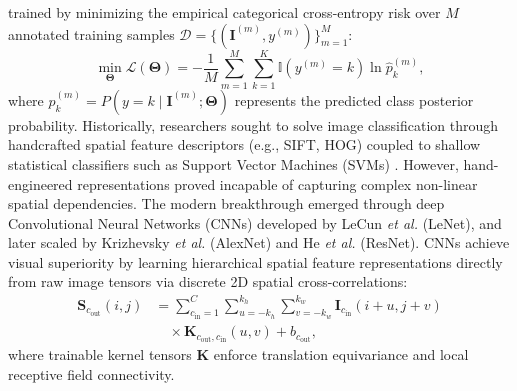 \documentclass[journal]{IEEEtran}
\begin{document}
trained by minimizing the empirical categorical cross-entropy risk over $M$ annotated training samples $\mathcal{D} = \{(\mathbf{I}^{(m)}, y^{(m)})\}_{m=1}^M$:
\begin{equation}
\min_{\boldsymbol{\Theta}} \mathcal{L}(\boldsymbol{\Theta}) = -\frac{1}{M} \sum_{m=1}^M \sum_{k=1}^K \mathbb{I}(y^{(m)} = k) \ln \hat{p}_k^{(m)},
\label{eq:cross_entropy_objective}
\end{equation}
where $\hat{p}_k^{(m)} = P(y = k \mid \mathbf{I}^{(m)}; \boldsymbol{\Theta})$ represents the predicted class posterior probability. Historically, researchers sought to solve image classification through handcrafted spatial feature descriptors (e.g., SIFT, HOG) coupled to shallow statistical classifiers such as Support Vector Machines (SVMs) \cite{cortes1995support, rebentrost2014quantum}. However, hand-engineered representations proved incapable of capturing complex non-linear spatial dependencies. The modern breakthrough emerged through deep Convolutional Neural Networks (CNNs) developed by LeCun \textit{et al.} \cite{lecun1998gradient} (LeNet), and later scaled by Krizhevsky \textit{et al.} \cite{krizhevsky2012imagenet} (AlexNet) and He \textit{et al.} \cite{he2016deep} (ResNet). CNNs achieve visual superiority by learning hierarchical spatial feature representations directly from raw image tensors via discrete 2D spatial cross-correlations:
\begin{align}
\mathbf{S}_{c_{\mathrm{out}}}(i, j) &= \sum_{c_{\mathrm{in}}=1}^C \sum_{u=-k_h}^{k_h} \sum_{v=-k_w}^{k_w} \mathbf{I}_{c_{\mathrm{in}}}(i+u, j+v) \nonumber \\
&\quad \times \mathbf{K}_{c_{\mathrm{out}}, c_{\mathrm{in}}}(u, v) + b_{c_{\mathrm{out}}},
\label{eq:classical_conv_math}
\end{align}
where trainable kernel tensors $\mathbf{K}$ enforce translation equivariance and local receptive field connectivity.
\end{document}
